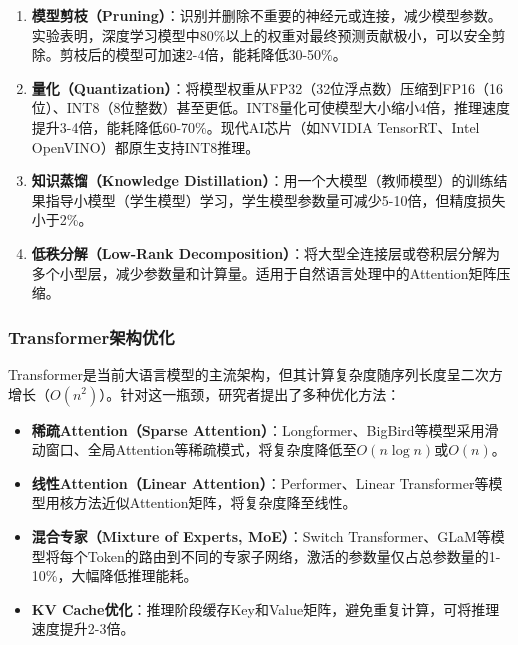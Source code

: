 \begin{enumerate}
    \item \textbf{模型剪枝（Pruning）}：识别并删除不重要的神经元或连接，减少模型参数。实验表明，深度学习模型中80\%以上的权重对最终预测贡献极小，可以安全剪除。剪枝后的模型可加速2-4倍，能耗降低30-50\%。

    \item \textbf{量化（Quantization）}：将模型权重从FP32（32位浮点数）压缩到FP16（16位）、INT8（8位整数）甚至更低。INT8量化可使模型大小缩小4倍，推理速度提升3-4倍，能耗降低60-70\%。现代AI芯片（如NVIDIA TensorRT、Intel OpenVINO）都原生支持INT8推理。

    \item \textbf{知识蒸馏（Knowledge Distillation）}：用一个大模型（教师模型）的训练结果指导小模型（学生模型）学习，学生模型参数量可减少5-10倍，但精度损失小于2\%。

    \item \textbf{低秩分解（Low-Rank Decomposition）}：将大型全连接层或卷积层分解为多个小型层，减少参数量和计算量。适用于自然语言处理中的Attention矩阵压缩。
\end{enumerate}

\subsubsection{Transformer架构优化}

Transformer是当前大语言模型的主流架构，但其计算复杂度随序列长度呈二次方增长（$O(n^2)$）。针对这一瓶颈，研究者提出了多种优化方法：

\begin{itemize}
    \item \textbf{稀疏Attention（Sparse Attention）}：Longformer、BigBird等模型采用滑动窗口、全局Attention等稀疏模式，将复杂度降低至$O(n \log n)$或$O(n)$。

    \item \textbf{线性Attention（Linear Attention）}：Performer、Linear Transformer等模型用核方法近似Attention矩阵，将复杂度降至线性。

    \item \textbf{混合专家（Mixture of Experts, MoE）}：Switch Transformer、GLaM等模型将每个Token的路由到不同的专家子网络，激活的参数量仅占总参数量的1-10\%，大幅降低推理能耗。

    \item \textbf{KV Cache优化}：推理阶段缓存Key和Value矩阵，避免重复计算，可将推理速度提升2-3倍。
\end{itemize}

